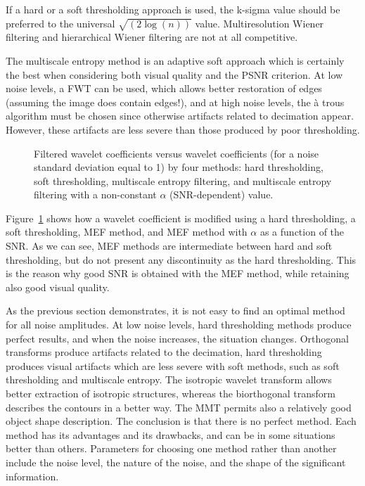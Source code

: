 If a hard or a soft thresholding approach is used, the k-sigma value should be
preferred to the universal $\sqrt{(2 \log(n))}$ value. 
Multiresolution Wiener filtering and hierarchical Wiener filtering are
not at all competitive.

 The multiscale entropy method is an adaptive soft approach 
which is certainly the best when considering both visual quality and the
PSNR criterion. At low noise levels, a FWT can be used, 
which allows better restoration of edges (assuming the image does 
contain edges!),
and at high noise levels, the \`a trous algorithm must be chosen since 
otherwise
artifacts related to decimation appear. However, these artifacts are less
severe than those produced by poor thresholding. 

\begin{figure}[htb]
\centerline{
\vbox{ 
}}
\caption{Filtered wavelet coefficients versus wavelet coefficients (for a
noise standard deviation equal to 1) by four methods: hard thresholding, soft
thresholding, multiscale entropy filtering, and multiscale entropy filtering
with a non-constant $\alpha$ (SNR-dependent) value.}
\label{fig_cmp_filter}
\end{figure}

Figure~\ref{fig_cmp_filter} shows how a wavelet coefficient is modified using
a hard thresholding, a soft thresholding, MEF method, and MEF method with
$\alpha$ as a function of the SNR. As we can see, MEF methods are intermediate
between hard and soft thresholding, but do not present any discontinuity
as the hard thresholding. This is the reason why good SNR is obtained with
the MEF method, while retaining also good visual quality. 

 
As the previous section demonstrates, it is not easy to find an optimal
method for all noise amplitudes. At low noise levels, hard thresholding
methods produce perfect results, and when the noise increases, the 
situation changes. Orthogonal transforms produce artifacts related to the 
decimation, hard thresholding produces visual artifacts  which
are less severe with soft methods, such  as soft thresholding and multiscale
entropy. The isotropic wavelet transform allows better extraction of
 isotropic structures, whereas the biorthogonal transform describes  
 the contours in a better way. The MMT permits also a relatively good 
object shape description. The conclusion is that there is no perfect method.
 Each method has its advantages and its drawbacks, and can  be
in some situations  better than others. Parameters for choosing
one method rather than another include  the noise level, the nature of
the noise, and the shape of the significant information.

